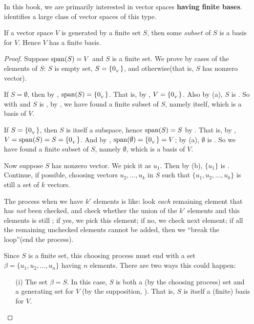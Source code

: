 In this book, we are primarily interested in vector spaces \textbf{having finite bases}.
 identifies a large class of vector spaces of this type.

\begin{theorem} \label{thm 1.9}
If a vector space \(V\) is generated by a finite set \(S\), then some \(subset\) of \(S\) is a basis for \(V\).
Hence \(V\) has a finite basis.
\end{theorem}

\begin{proof}
Suppose \(\operatorname{span}(S) = V\)  and \(S\) is a finite set.
We prove by cases of the elements of \(S\): \(S\) is empty set, \(S = \{ 0_{_V} \}\), and otherwise(that is, \(S\) has nonzero vector).

If \(S = \emptyset\), then by , \(\operatorname{span}(S) = \{ 0_{_V} \}\).
That is, by , \(V = \{ 0_{_V} \}\).
Also by (a), \(S\) is \LID{}.
So with  and \(S\) is \LID{}, by , we have found a finite subset of \(S\), namely itself, which is a basis of \(V\).

If \(S = \{ 0_{_V} \}\), then \(S\) is itself a subspace, hence \(\operatorname{span}(S) = S\) by .
That is, by , \(V = \operatorname{span}(S) = S = \{ 0_{_V} \}\).
And by , \(\operatorname{span}(\emptyset) = \{ 0_{_V} \} = V\);
by (a), \(\emptyset\) is \LID{}.
So we have found a finite subset of \(S\), namely \(\emptyset\), which is a basis of \(V\).

Now suppose \(S\) has nonzero vector.
We pick it as \(u_1\).
Then by (b), \(\{ u_1 \}\) is \LID{}.
Continue, if possible, choosing vectors \(u_2, ..., u_k\) in \(S\) such that \(\{ u_1, u_2, ..., u_k \}\) is still a \LID{} set of \(k\) vectors. 

The process when we have \(k'\) elements is like: look \emph{each} remaining element that has \emph{not} been checked, and check whether the union of the \(k'\) elements and this elements is still \LID{};
if yes, we pick this element;
if no, we check next element;
if all the remaining unchecked elements cannot be added, then we ``break the loop''(end the process).

Since \(S\) is a finite set, this choosing process must end with a \LID{} set \(\beta = \{ u_1, u_2, ..., u_n \}\) having \(n\) elements.
There are two ways this could happen:
\begin{enumerate}
\item[(i)] The set \(\beta = S\).
    In this case, \(S\) is both a \LID{}(by the choosing process) set and a generating set for \(V\) (by the supposition, ).
    That is, \(S\) is itself a (finite) basis for \(V\).


\end{enumerate}
\end{proof}
